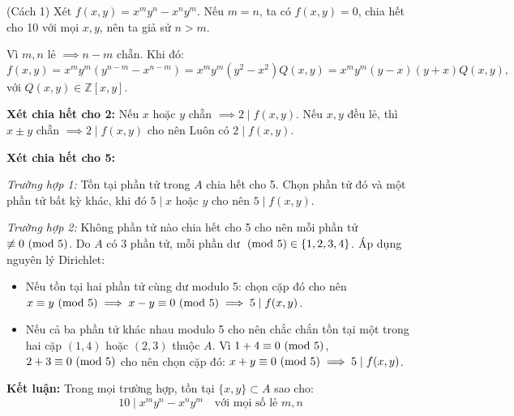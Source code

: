 \documentclass[../05-modular-arithmetic-a.tex]{subfiles}
\begin{document}
\begin{soln}(Cách 1)\footnotemark
	Xét \( f(x, y) = x^m y^n - x^n y^m \). Nếu \( m = n \), ta có \( f(x, y) = 0 \), chia hết cho 10 với mọi \( x, y \), nên ta giả sử \( n > m \).

	Vì \( m, n \) lẻ \( \implies n - m \) chẵn. Khi đó:
	\[
		f(x, y) = x^m y^m (y^{n - m} - x^{n - m})
	= x^m y^m (y^2 - x^2) Q(x, y)
= x^m y^m (y - x)(y + x) Q(x, y),
	\]
	với \( Q(x, y) \in \mathbb{Z}[x, y] \).

	\textbf{Xét chia hết cho 2:} Nếu \( x \) hoặc \( y \) chẵn \( \implies 2 \mid f(x, y) \).  
	Nếu \( x, y \) đều lẻ, thì \( x \pm y \) chẵn \( \implies 2 \mid f(x, y) \) cho nên Luôn có \( 2 \mid f(x, y) \).

	\textbf{Xét chia hết cho 5:}

	\textit{Trường hợp 1:} Tồn tại phần tử trong \( A \) chia hết cho 5.  
	Chọn phần tử đó và một phần tử bất kỳ khác, khi đó \( 5 \mid x \) hoặc \( y \) cho nên \( 5 \mid f(x, y) \).

	\textit{Trường hợp 2:} Không phần tử nào chia hết cho 5 cho nên mỗi phần tử \( \not\equiv 0 \ (\mathrm{mod}\ 5) \).  
	Do \( A \) có 3 phần tử, mỗi phần dư \( \ (\mathrm{mod}\ 5) \in \{1, 2, 3, 4\} \). Áp dụng nguyên lý Dirichlet:

	\begin{itemize}[topsep=0pt, partopsep=0pt, itemsep=0pt]
		\item Nếu tồn tại hai phần tử cùng dư modulo 5: chọn cặp đó cho nên \( x \equiv y \ (\mathrm{mod}\ 5) \implies x - y \equiv 0 \ (\mathrm{mod}\ 5) \implies 5 \mid f(x, y) \).
		\item Nếu cả ba phần tử khác nhau modulo 5 cho nên chắc chắn tồn tại một trong hai cặp \( (1, 4) \) hoặc \( (2, 3) \) thuộc \( A \).  
		Vì \( 1 + 4 \equiv 0 \ (\mathrm{mod}\ 5) \), \( 2 + 3 \equiv 0 \ (\mathrm{mod}\ 5) \) cho nên chọn cặp đó: \( x + y \equiv 0 \ (\mathrm{mod}\ 5) \implies 5 \mid f(x, y) \).
	\end{itemize}

	\textbf{Kết luận:} Trong mọi trường hợp, tồn tại \( \{x, y\} \subset A \) sao cho:
	\[
		\boxed{10 \mid x^m y^n - x^n y^m \quad \text{với mọi số lẻ } m, n}
	\]
\end{soln}

\end{document}
